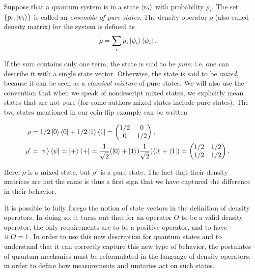 \begin{definition}
    Suppose that a quantum system is in a state $\ket{\psi_i}$ with probability $p_i$. The set $\{p_i, \ket{\psi_i}\}$ is called an \textit{ensemble of pure states}. The density operator $\rho$ (also called density matrix) for the system is defined as
    \begin{equation}
        \rho = \sum_i p_i \ket{\psi_i}\bra{\psi_i}.
    \end{equation}
\end{definition}

If the sum contains only one term, the state is said to be \textit{pure}, i.e. one can describe it with a single state vector. Otherwise, the state is said to be \textit{mixed}, because it can be seen as a \textit{classical mixture} of pure states. We will also use the convention that when we speak of nondescript mixed states, we explicitly mean states that are not pure (for some authors mixed states include pure states). The two states mentioned in our coin-flip example can be written

\begin{align}
    \rho &= 1/2 \ket{0}\bra{0} + 1/2 \ket{1}\bra{1} = \left(\begin{matrix}
        1/2 & 0\\
        0 & 1/2
    \end{matrix}\right),\\
    \rho' &= \ket{\psi}\bra{\psi} = \ket{+}\bra{+} = \frac{1}{\sqrt{2}}(\ket{0} + \ket{1})\frac{1}{\sqrt{2}}(\bra{0} + \bra{1}) = \left(\begin{matrix}
        1/2 & 1/2\\
        1/2 & 1/2
    \end{matrix}\right).
\end{align}

Here, $\rho$ is a mixed state, but $\rho'$ is a pure state. The fact that their density matrices are not the same is thus a first sign that we have captured the difference in their behavior.

It is possible to fully forego the notion of state vectors in the definition of density operators. In doing so, it turns out that for an operator $O$ to be a valid density operator, the only requirements are to be a positive operator, and to have $\operatorname{tr} O = 1$. In order to use this new description for quantum states and to understand that it can correctly capture this new type of behavior, the postulates of quantum mechanics must be reformulated in the language of density operators, in order to define how measurements and unitaries act on such states.

